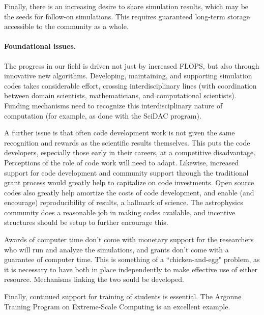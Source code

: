 \documentclass[11pt,twocolumn]{article}
\begin{document}
Finally, there is an increasing desire to share simulation results,
which may be the seeds for follow-on simulations.  This
requires guaranteed long-term storage accessible to the community as a
whole.

\paragraph*{Foundational issues.}

The progress in our field is driven not just by increased FLOPS, but
also through innovative new algorithms.  Developing, maintaining, and
supporting simulation codes takes considerable effort, crossing
interdisciplinary lines (with coordination between domain scientists,
mathematicians, and computational scientists).  Funding mechanisms
need to recognize this interdisciplinary nature of computation (for
example, as done with the SciDAC program).

A further issue is that
often code development work is not given the same recognition and
rewards as the scientific results themselves.  This puts the code
developers, especially those early in their careers, at a competitive
disadvantage.  Perceptions of the role of code work will need to
adapt.  Likewise, increased support for code development and community
support through the traditional grant process would greatly help to
capitalize on code investments.  Open source codes also greatly help
amortize the costs of code development, and enable (and encourage)
reproducibility of results, a hallmark of science.  The astrophysics
community does a reasonable job in making codes available, and
incentive structures should be setup to further encourage this.

Awards of computer time don't come with monetary support for the
researchers who will run and analyze the simulations, and grants don't
come with a guarantee of computer time.  This is something of a
``chicken-and-egg" problem, as it is necessary to have both in place
independently to make effective use of either resource.  Mechanisms
linking the two sould be developed.

Finally, continued support for training of students is essential. The
Argonne Training Program on Extreme-Scale Computing is an excellent
example.
\end{document}
